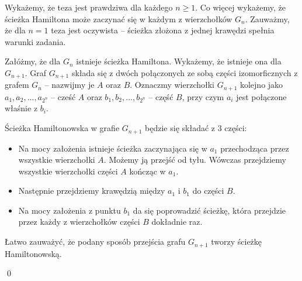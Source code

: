 \noindent
Wykażemy, że teza jest prawdziwa dla każdego $n \geqslant 1$. Co więcej wykażemy, że ścieżka Hamiltona może zaczynać się w każdym z wierzchołków $G_n$.
Zauważmy, że dla $n = 1$ teza jest oczywista -- ścieżka złożona z jednej krawędzi spełnia warunki zadania.

\vspace{10px}

\noindent
Załóżmy, że dla $G_n$ istnieje ścieżka Hamiltona. Wykażemy, że istnieje ona dla $G_{n + 1}$. Graf $G_{n+1}$ składa się z dwóch połączonych ze sobą części izomorficznych z grafem $G_n$ -- nazwijmy je $A$ oraz $B$. Oznaczmy wierzchołki $G_{n + 1}$ kolejno jako
$a_1, a_2, ..., a_{2^n}$ -- cześć $A$ oraz $b_1, b_2, ..., b_{2^n}$ -- część $B$, przy czym $a_i$ jest połączone właśnie z $b_i$. 

\vspace{10px}

\noindent
Ścieżka Hamiltonowska w grafie $G_{n + 1}$ będzie się składać z 3 części:
\begin{itemize}
	\item Na mocy założenia istnieje ścieżka zaczynająca się w $a_1$ przechodząca przez wszystkie wierzchołki $A$. Możemy ją przejść od tyłu. Wówczas przejdziemy wszystkie wierzchołki części $A$ kończąc w $a_1$.
	\item Następnie przejdziemy krawędzią między $a_1$ i $b_1$ do części $B$.
	\item Na mocy założenia z punktu $b_1$ da się poprowadzić ścieżkę, która przejdzie przez każdy z wierzchołków części $B$ dokładnie raz.
\end{itemize}

\noindent
Łatwo zauważyć, że podany sposób przejścia grafu $G_{n + 1}$ tworzy ścieżkę Hamiltonowską.

\qed

\newpage
